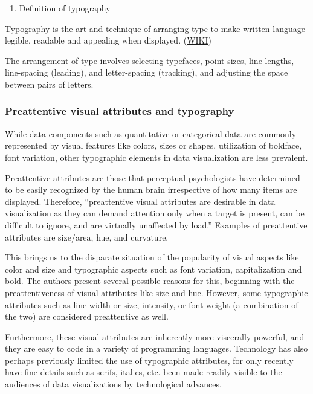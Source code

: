 \documentclass[]{book}
\providecommand{\tightlist}{%
  \setlength{\itemsep}{0pt}\setlength{\parskip}{0pt}}
\begin{document}
\begin{enumerate}
\def\labelenumi{\arabic{enumi}.}
\tightlist
\item
  Definition of typography
\end{enumerate}

Typography is the art and technique of arranging type to make written
language legible, readable and appealing when displayed.
(\href{https://en.wikipedia.org/wiki/Typography}{WIKI})

The arrangement of type involves selecting typefaces, point sizes, line
lengths, line-spacing (leading), and letter-spacing (tracking), and
adjusting the space between pairs of letters.

\subsubsection{Preattentive visual attributes and
typography}\label{preattentive-visual-attributes-and-typography}

While data components such as quantitative or categorical data are
commonly represented by visual features like colors, sizes or shapes,
utilization of boldface, font variation, other typographic elements in
data visualization are less prevalent.

Preattentive attributes are those that perceptual psychologists have
determined to be easily recognized by the human brain irrespective of
how many items are displayed. Therefore, ``preattentive visual
attributes are desirable in data visualization as they can demand
attention only when a target is present, can be difficult to ignore, and
are virtually unaffected by load.'' Examples of preattentive attributes
are size/area, hue, and curvature.

This brings us to the disparate situation of the popularity of visual
aspects like color and size and typographic aspects such as font
variation, capitalization and bold. The authors present several possible
reasons for this, beginning with the preattentiveness of visual
attributes like size and hue. However, some typographic attributes such
as line width or size, intensity, or font weight (a combination of the
two) are considered preattentive as well.

Furthermore, these visual attributes are inherently more viscerally
powerful, and they are easy to code in a variety of programming
languages. Technology has also perhaps previously limited the use of
typographic attributes, for only recently have fine details such as
serifs, italics, etc. been made readily visible to the audiences of data
visualizations by technological advances.
\end{document}
